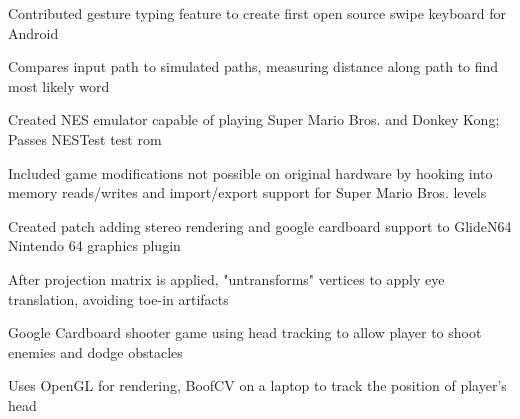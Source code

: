 \documentclass[12pt]{jmichaud-resume}
\begin{document}
\begin{minipage}[t]{0.65\textwidth}
 \hfill {}

\sectionsep

 \hfill
{}
\begin{tightemize}
	\item Contributed gesture typing feature to create first open source swipe keyboard for Android
	\item Compares input path to simulated paths, measuring distance along path to find most likely word
\end{tightemize}

\sectionsep

 \hfill
{}
\begin{tightemize}
	\item Created NES emulator capable of playing Super Mario Bros. and Donkey Kong; Passes NESTest test rom
	\item Included game modifications not possible on original hardware by hooking into memory reads/writes and import/export support for Super Mario Bros. levels
\end{tightemize}

\sectionsep
\iftrue
{} \hfill
{}
\begin{tightemize}
	\item Created patch adding stereo rendering and google cardboard support to GlideN64 Nintendo 64 graphics plugin
	\item After projection matrix is applied, "untransforms" vertices to apply eye translation, avoiding toe-in artifacts
\end{tightemize}
\sectionsep
\fi

\iftrue
{} \hfill
{}
\begin{tightemize}
	\item Google Cardboard shooter game using head tracking to allow player to shoot enemies and dodge obstacles
	\item Uses OpenGL for rendering, BoofCV on a laptop to track the position of player’s head
\end{tightemize}
\sectionsep
\fi

\iffalse
\runsubsection{Rust/Servo Gui Framework Demo} \hfill
\location{Rust}
\begin{tightemize}
	\item Fork of servo browser engine supporting a simple react-like rust html macro and native rust event handlers
	\item Like electron, but using native rust + servo instead of javascript + webkit. 
\end{tightemize}
\sectionsep
\fi

\end{minipage}
\end{document}
